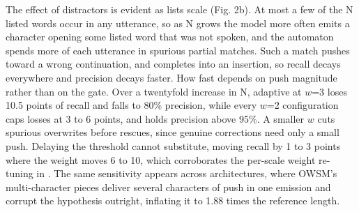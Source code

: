 \documentclass{article}
\begin{document}
The effect of distractors is evident as lists scale (Fig. 2b). At most a few of the N listed words occur in any utterance, so as N grows the model more often emits a character opening some listed word that was not spoken, and the automaton spends more of each utterance in spurious partial matches. Such a match pushes toward a wrong continuation, and completes into an insertion, so recall decays everywhere and precision decays faster. How fast depends on push magnitude rather than on the gate. Over a twentyfold increase in N, adaptive at $w$=3 loses 10.5 points of recall and falls to 80\% precision, while every $w$=2 configuration caps losses at 3 to 6 points, and holds precision above 95\%. A smaller $w$ cuts spurious overwrites before rescues, since genuine corrections need only a small push. Delaying the threshold cannot substitute, moving recall by 1 to 3 points where the weight moves 6 to 10, which corroborates the per-scale weight re-tuning in \cite{andrusenko2025turbobias}. The same sensitivity appears across architectures, where OWSM's multi-character pieces deliver several characters of push in one emission and corrupt the hypothesis outright, inflating it to 1.88 times the reference length.



\end{document}
